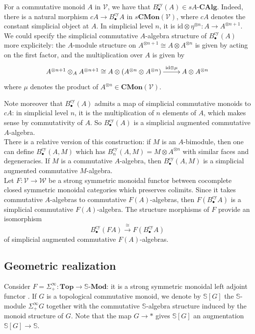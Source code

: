 \documentclass[a4paper,11pt]{amsart} %
\theoremstyle{definition} \newtheorem{defn}[equation]{Definition}
\theoremstyle{remark} \newtheorem{notation}[equation]{Notation}
\theoremstyle{plain} \newtheorem{teo}[equation]{Theorem}
\theoremstyle{plain} \newtheorem{lema}[equation]{Lemma}
\theoremstyle{plain} \newtheorem{prop}[equation]{Proposition}
\theoremstyle{plain} \newtheorem{corolario}[equation]{Corollary}
\theoremstyle{remark} \newtheorem{obs}[equation]{Remark}
\theoremstyle{remark} \newtheorem{sideobs}[equation]{Side remark}
\theoremstyle{remark} \newtheorem{ejercicio}[equation]{Exercise}
\theoremstyle{definition} \newtheorem{notn}[equation]{Notation}
\theoremstyle{remark} \newtheorem{ej}[equation]{Example}
\theoremstyle{remark} \newtheorem{contraej}[equation]{Counterexample}
\theoremstyle{plain} \newtheorem{conj}[equation]{Conjecture}
\renewcommand{\1}{\ensuremath{\mathbbm{1}}}
\newcommand{\V}{\mathcal{V}}
\newcommand{\W}{\mathcal{W}}
\renewcommand{\S}{\mathbb{S}}
\newcommand{\id}{\mathrm{id}}
\newcommand{\CMon}{\ensuremath{\mathbf{CMon}}}
\newcommand{\ACAlg}{\ensuremath{A}\mbox{-}\ensuremath{\mathbf{CAlg}}}
\newcommand{\SMod}{\ensuremath{\mathbb{S}}\mbox{-}\ensuremath{\textbf{Mod}}}
\newcommand{\Top}{\ensuremath{\mathbf{Top}}}
\newcommand{\cy}{\mathrm{cy}}
\newcommand{\sip}{\Sigma^\infty_+}
\numberwithin{equation}{section}
\begin{document}
For a commutative monoid $A$ in $\V$, we have that $B_\bullet^\cy(A)\in s\ACAlg$. Indeed, there is a natural morphism $cA\to B_\bullet^\cy A$ in $s\CMon(\V)$, where $cA$ denotes the constant simplicial object at $A$. In simplicial level $n$, it is $\id \otimes \eta^{\otimes n}:A\to A^{\otimes n+1}$. We could specify the simplicial commutative $A$-algebra structure of $B^\cy_\bullet(A)$ more explicitely: the $A$-module structure on $A^{\otimes n+1}\cong A\otimes A^{\otimes n}$ is given by acting on the first factor, and the multiplication over $A$ is given by 
\[\xymatrix{A^{\otimes n+1}\otimes_A A^{\otimes n+1}\cong A \otimes (A^{\otimes n} \otimes A^{\otimes n}) \ar[r]^-{\id \otimes \mu} & A\otimes A^{\otimes n}}\]
where $\mu$ denotes the product of $A^{\otimes n}\in \CMon(\V)$.

Note moreover that $B_\bullet^\cy(A)$ admits a map of simplicial commutative monoids to $cA$: in simplicial level $n$, it is the multiplication of $n$ elements of $A$, which makes sense by commutativity of $A$. So $B_\bullet^\cy(A)$ is a simplicial augmented commutative $A$-algebra.\\

There is a relative version of this construction: if $M$ is an $A$-bimodule, then one can define $B_\bullet^\cy(A,M)$ which has $B_n^\cy(A,M)=M\otimes A^{\otimes n}$ with similar faces and degeneracies. If $M$ is a commutative $A$-algebra, then $B_\bullet^\cy(A,M)$ is a simplicial augmented commutative $M$-algebra.\\

Let $F:\V\to \W$ be a strong symmetric monoidal functor between cocomplete closed symmetric monoidal categories which preserves colimits. Since it takes commutative $A$-algebras to commutative $F(A)$-algebras, then $F(B^\cy_\bullet A)$ is a simplicial commutative $F(A)$-algebra. The structure morphisms of $F$ provide an %
 isomorphism \begin{equation} \label{bf} B_\bullet^\cy(FA)\stackrel{\cong}{\to} F(B_\bullet^\cy A)\end{equation} of simplicial augmented commutative $F(A)$-algebras.

\subsection{Geometric realization} \label{sect:geom} Consider $F=\sip:\Top\to \SMod$: it is a strong symmetric monoidal left adjoint functor \cite[II.1.2]{ekmm}. If $G$ is a topological commutative monoid, we denote by $\S[G]$ the $\S$-module $\sip G$ together with the commutative $\S$-algebra structure induced by the monoid structure of $G$. Note that the map $G\to *$ gives $\S[G]$ an augmentation $\S[G]\to \S$.
\end{document}
